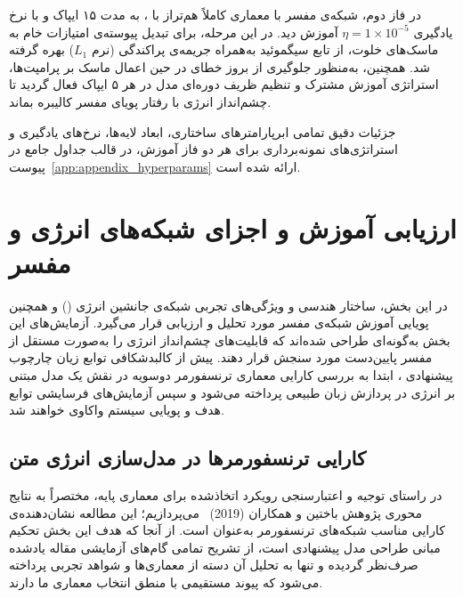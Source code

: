 در فاز دوم، شبکه‌ی مفسر با معماری کاملاً هم‌تراز با ، به مدت ۱۵ ایپاک و با نرخ یادگیری $\eta = 1 \times 10^{-5}$ آموزش دید. در این مرحله، برای تبدیل پیوسته‌ی امتیازات خام به ماسک‌های خلوت، از تابع سیگموئید به‌همراه جریمه‌ی پراکندگی (نرم $L_1$) بهره گرفته شد. همچنین، به‌منظور جلوگیری از بروز خطای  در حین اعمال ماسک بر پرامپت‌ها، استراتژی آموزش مشترک و تنظیم ظریف دوره‌ای مدل  در هر ۵ ایپاک فعال گردید تا چشم‌انداز انرژی با رفتار پویای مفسر کالیبره بماند.

جزئیات دقیق تمامی ابرپارامترهای ساختاری، ابعاد لایه‌ها، نرخ‌های یادگیری و استراتژی‌های نمونه‌برداری برای هر دو فاز آموزش، در قالب جداول جامع در پیوست~\ref{app:appendix_hyperparams} ارائه شده است.


\section{ارزیابی آموزش و اجزای شبکه‌های انرژی و مفسر}\label{sec:5-2}

در این بخش، ساختار هندسی و ویژگی‌های تجربی شبکه‌ی جانشین انرژی () و همچنین پویایی آموزش شبکه‌ی مفسر مورد تحلیل و ارزیابی قرار می‌گیرد. آزمایش‌های این بخش به‌گونه‌ای طراحی شده‌اند که قابلیت‌های چشم‌انداز انرژی را به‌صورت مستقل از مفسر پایین‌دست مورد سنجش قرار دهند. پیش از کالبدشکافی توابع زیان چارچوب پیشنهادی ، ابتدا به بررسی کارایی معماری ترنسفورمر دوسویه در نقش یک مدل مبتنی بر انرژی در پردازش زبان طبیعی پرداخته می‌شود و سپس آزمایش‌های فرسایشی توابع هدف و پویایی سیستم واکاوی خواهند شد.

\subsection{کارایی ترنسفورمرها در مدل‌سازی انرژی متن}\label{sec:5-2-1}

در راستای توجیه و اعتبارسنجی رویکرد اتخاذشده برای معماری پایه، مختصراً به نتایج محوری پژوهش باختین و همکاران (2019)~\cite{bakhtin2019realfake} می‌پردازیم؛ این مطالعه نشان‌دهنده‌ی کارایی مناسب شبکه‌های ترنسفورمر به‌عنوان  است. از آنجا که هدف این بخش تحکیم مبانی طراحی مدل پیشنهادی است، از تشریح تمامی گام‌های آزمایشی مقاله یادشده صرف‌نظر گردیده و تنها به تحلیل آن دسته از معماری‌ها و شواهد تجربی پرداخته می‌شود که پیوند مستقیمی با منطق انتخاب معماری ما دارند.

